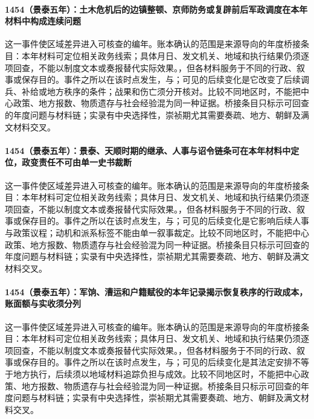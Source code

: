 \paragraph{1454（景泰五年）：土木危机后的边镇整顿、京师防务或复辟前后军政调度在本年材料中构成连续问题} 这一事件使区域差异进入可核查的编年。账本确认的范围是来源导向的年度桥接条目：本年材料可定位相关政务线索；具体月日、发文机关、地域和执行结果仍须逐项回查，不能以制度文本或奏报替代实际效果。，但各材料服务于不同的行政、叙事或保存目的。事件之所以在该时点发生，与；可见的后续变化是它改变了后续调兵、补给或地方秩序的条件；战果和伤亡须分开核对。比较不同地区时，不能把中心政策、地方报数、物质遗存与社会经验混为同一种证据。桥接条目只标示可回查的年度问题与材料链；实录有中央选择性，崇祯期尤其需要奏疏、地方、朝鲜及满文材料交叉。

\paragraph{1454（景泰五年）：景泰、天顺时期的继承、人事与诏令链条可在本年材料中定位，政变责任不可由单一史书裁断} 这一事件使区域差异进入可核查的编年。账本确认的范围是来源导向的年度桥接条目：本年材料可定位相关政务线索；具体月日、发文机关、地域和执行结果仍须逐项回查，不能以制度文本或奏报替代实际效果。，但各材料服务于不同的行政、叙事或保存目的。事件之所以在该时点发生，与；可见的后续变化是它影响后续人事与政策议程；动机和派系标签不能由单一叙事裁定。比较不同地区时，不能把中心政策、地方报数、物质遗存与社会经验混为同一种证据。桥接条目只标示可回查的年度问题与材料链；实录有中央选择性，崇祯期尤其需要奏疏、地方、朝鲜及满文材料交叉。

\paragraph{1454（景泰五年）：军饷、漕运和户籍赋役的本年记录揭示恢复秩序的行政成本，账面额与实收须分列} 这一事件使区域差异进入可核查的编年。账本确认的范围是来源导向的年度桥接条目：本年材料可定位相关政务线索；具体月日、发文机关、地域和执行结果仍须逐项回查，不能以制度文本或奏报替代实际效果。，但各材料服务于不同的行政、叙事或保存目的。事件之所以在该时点发生，与；可见的后续变化是其法定安排不等于地方执行，后续须以地域材料追踪负担与成效。比较不同地区时，不能把中心政策、地方报数、物质遗存与社会经验混为同一种证据。桥接条目只标示可回查的年度问题与材料链；实录有中央选择性，崇祯期尤其需要奏疏、地方、朝鲜及满文材料交叉。

